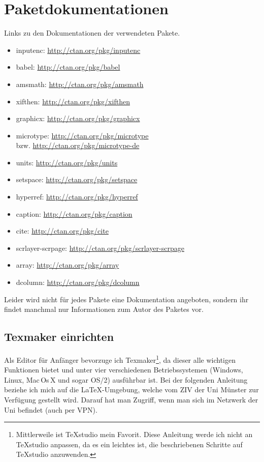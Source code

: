 \label{anhang}

\section{Paketdokumentationen}

Links zu den Dokumentationen der verwendeten Pakete.

\begin{itemize}
    \item inputenc: \url{http://ctan.org/pkg/inputenc}
    \item babel: \url{http://ctan.org/pkg/babel}
    \item amsmath: \url{http://ctan.org/pkg/amsmath}
    \item xifthen: \url{http://ctan.org/pkg/xifthen}
    \item graphicx: \url{http://ctan.org/pkg/graphicx}
    \item microtype: \url{http://ctan.org/pkg/microtype} \\
	    bzw. \url{http://ctan.org/pkg/microtype-de}
    \item units: \url{http://ctan.org/pkg/units}
    \item setspace: \url{http://ctan.org/pkg/setspace}
    \item hyperref: \url{http://ctan.org/pkg/hyperref}
    \item caption: \url{http://ctan.org/pkg/caption}
    \item cite: \url{http://ctan.org/pkg/cite}
    \item scrlayer-scrpage: \url{http://ctan.org/pkg/scrlayer-scrpage}
    \item array: \url{http://ctan.org/pkg/array}
    \item dcolumn: \url{http://ctan.org/pkg/dcolumn}
\end{itemize}

Leider wird nicht für jedes Pakete eine Dokumentation angeboten, sondern ihr findet manchmal nur Informationen zum Autor des Paketes vor.

\clearpage

\subsection{Texmaker einrichten}\label{sec:texmaker}

Als Editor für Anfänger bevorzuge ich Texmaker\footnote{Mittlerweile ist TeXstudio mein Favorit. Diese Anleitung werde ich nicht an TeXstudio anpassen, da es ein leichtes ist, die beschriebenen Schritte auf TeXstudio anzuwenden.}, da dieser alle wichtigen Funktionen bietet und unter vier verschiedenen Betriebssystemen (Windows, Linux, Mac\,Os\,X und sogar OS/2) ausführbar ist. Bei der folgenden Anleitung beziehe ich mich auf die \LaTeX-Umgebung, welche vom ZIV der Uni Münster zur Verfügung gestellt wird. Darauf hat man Zugriff, wenn man sich im Netzwerk der Uni befindet (auch per VPN).


